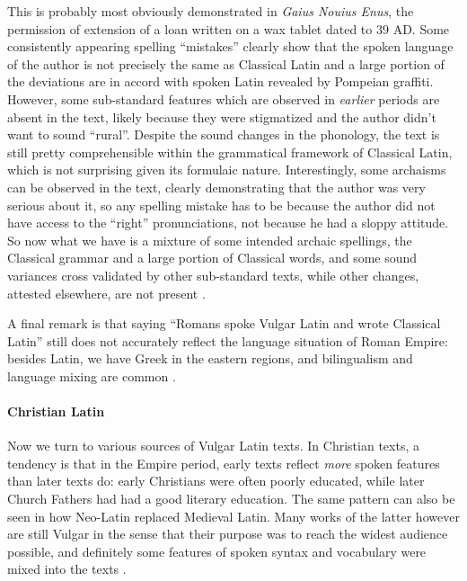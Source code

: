 \documentclass[a4paper, oneside, 12pt]{report}
\newcommand*{\citesec}[1]{\S~{#1}}
\newcommand*{\citepage}[1]{p.~{#1}}
\newcommand{\literature}[1]{\textit{#1}}
\begin{document}
This is probably most obviously demonstrated in \literature{Gaius Nouius Enus},
the permission of extension of a loan written on a wax tablet dated to 39 AD.
Some consistently appearing spelling ``mistakes'' clearly show that
the spoken language of the author is not precisely the same as Classical Latin
and a large portion of the deviations are in accord with spoken Latin revealed by Pompeian graffiti.
However, some sub-standard features which are observed in \emph{earlier} periods
are absent in the text,
likely because they were stigmatized and the author didn't want to sound ``rural''.
Despite the sound changes in the phonology,
the text is still pretty comprehensible within the grammatical framework of Classical Latin,
which is not surprising given its formulaic nature.
Interestingly, some archaisms can be observed in the text,
clearly demonstrating that the author was very serious about it,
so any spelling mistake has to be because 
the author did not have access to the ``right'' pronunciations,
not because he had a sloppy attitude.
So now what we have is a mixture of some intended archaic spellings,
the Classical grammar and a large portion of Classical words,
and some sound variances cross validated by other sub-standard texts,
while other changes, attested elsewhere, are not present
\citep[\citesec{7.4.1}]{clackson2011blackwell}.

A final remark is that 
saying ``Romans spoke Vulgar Latin and wrote Classical Latin'' 
still does not accurately reflect the language situation of Roman Empire:
besides Latin, we have Greek in the eastern regions,
and bilingualism and language mixing are common
\citep[\citesec{7.2}]{clackson2011blackwell}.

\paragraph*{Christian Latin}
Now we turn to various sources of Vulgar Latin texts.
In Christian texts, a tendency is that in the Empire period,
early texts reflect \emph{more} spoken features than later texts do:
early Christians were often poorly educated,
while later Church Fathers had had a good literary education.
The same pattern can also be seen in how Neo-Latin replaced Medieval Latin.
Many works of the latter however are still Vulgar
in the sense that their purpose was to reach the widest audience possible,
and definitely some features of spoken syntax and vocabulary were mixed into the texts
\citep[\citepage{24}]{herman2010vulgar}.
\end{document}
